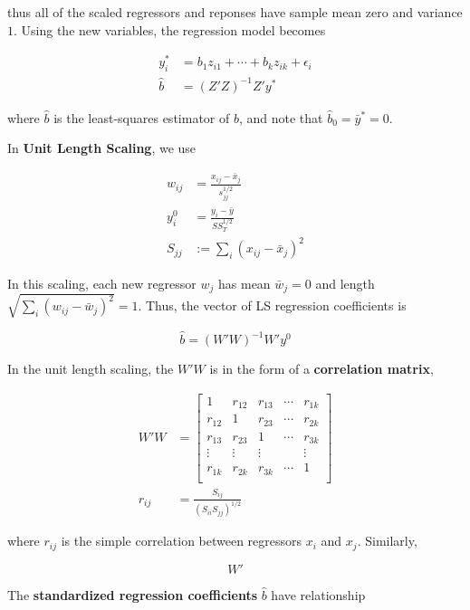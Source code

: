 \documentclass[12pt]{article}
\begin{document}
thus all of the scaled regressors and reponses have sample mean zero and variance $1$. Using the new variables, the regression model becomes

$$
\begin{aligned}
y_i^\ast &= b_1 z_{i1} + \cdots + b_k z_{ik} + \epsilon_i \\[8pt]
\hat{b} &= (Z'Z)^{-1}Z' y^{\ast}
\end{aligned}
$$

where $\hat{b}$ is the least-squares estimator of $b$, and note that $\hat{b}_0 = \bar{y}^\ast = 0$. 



\pagebreak
In \textbf{Unit Length Scaling}, we use

$$
\begin{aligned}
w_{ij} &= \frac{ x_{ij} - \bar{x}_j }{ s_{jj}^{1/2} } \\[8pt]
y_i^0 &= \frac{y_i - \bar{y} }{SS_T^{1/2}} \\[10pt]
S_{jj} &:= \sum_i (x_{ij} - \bar{x}_j)^2
\end{aligned}
$$

In this scaling, each new regressor $w_j$ has mean $\bar{w}_j = 0$ and length $\sqrt{ \sum_i ( w_{ij} - \bar{w}_j)^2 } = 1 $. Thus, the vector of LS regression coefficients is

$$
\hat{b} = (W'W)^{-1}W' y^0
$$

In the unit length scaling, the $W'W$ is in the form of a \textbf{correlation matrix},

$$
\begin{aligned}
W'W &=  \begin{bmatrix}  1      & r_{12} & r_{13} & \cdots & r_{1k} \\
						 r_{12} & 1      & r_{23} & \cdots & r_{2k} \\
						 r_{13} & r_{23} & 1      & \cdots & r_{3k} \\
						 \vdots & \vdots & \vdots &        & \vdots \\
						 r_{1k} & r_{2k} & r_{3k} & \cdots & 1      \\\end{bmatrix}\\[12pt]
r_{ij} &= \frac{S_{ij}}{(S_{ii} S_{jj} )^{1/2}}
\end{aligned}
$$

where $r_{ij}$ is the simple correlation between regressors $x_i$ and $x_j$. Similarly, 

$$
W'
$$

The \textbf{standardized regression coefficients} $\hat{b}$ have relationship 
\end{document}
